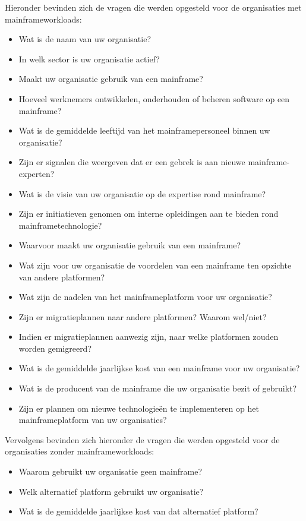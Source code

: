 Hieronder bevinden zich de vragen die werden opgesteld voor de organisaties met mainframeworkloads:
 \begin{itemize}
    \item Wat is de naam van uw organisatie?
    \item In welk sector is uw organisatie actief?
    \item Maakt uw organisatie gebruik van een mainframe?
    \item Hoeveel werknemers ontwikkelen, onderhouden of beheren software op een mainframe?
    \item Wat is de gemiddelde leeftijd van het mainframepersoneel binnen uw organisatie?
    \item Zijn er signalen die weergeven dat er een gebrek is aan nieuwe mainframe-experten?
    \item Wat is de visie van uw organisatie op de expertise rond mainframe?
    \item Zijn er initiatieven genomen om interne opleidingen aan te bieden rond mainframetechnologie?
    \item Waarvoor maakt uw organisatie gebruik van een mainframe?
    \item Wat zijn voor uw organisatie de voordelen van een mainframe ten opzichte van andere platformen?
    \item Wat zijn de nadelen van het mainframeplatform voor uw organisatie?
    \item Zijn er migratieplannen naar andere platformen? Waarom wel/niet?
    \item Indien er migratieplannen aanwezig zijn, naar welke platformen zouden worden gemigreerd?
    \item Wat is de gemiddelde jaarlijkse kost van een mainframe voor uw organisatie?
    \item Wat is de producent van de mainframe die uw organisatie bezit of gebruikt?
    \item Zijn er plannen om nieuwe technologieën te implementeren op het mainframeplatform van uw organisaties?
\end{itemize}

\newpage

Vervolgens bevinden zich hieronder de vragen die werden opgesteld voor de organisaties zonder mainframeworkloads:
 \begin{itemize}
    \item Waarom gebruikt uw organisatie geen mainframe?
    \item Welk alternatief platform gebruikt uw organisatie?
    \item Wat is de gemiddelde jaarlijkse kost van dat alternatief platform?
\end{itemize}

